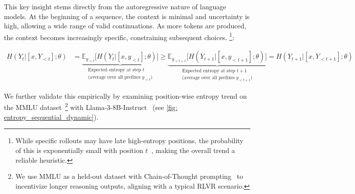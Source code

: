 % 
This key insight stems directly from the autoregressive nature of language models.
%
At the beginning of a sequence, the context is minimal and uncertainty is high, allowing a wide range of valid continuations. 
%
As more tokens are produced, the context becomes increasingly specific, constraining subsequent choices.
%
%
\footnote{While specific rollouts may have late high-entropy positions, the probability of this is exponentially small with position $t$~\citep{yang2025alignment}, making the overall trend a reliable heuristic.}:
%
\begin{small}
\begin{align}
\label{eq:entropy_decay}
H(Y_t | [x, Y_{<t}]; \theta) &= \underbrace{\mathbb{E}_{y_{<t}}\big[ H(Y_t | [x, y_{<t}]; \theta) \big]}_{\substack{\text{Expected entropy at step } t \\ \text{(average over all prefixes } y_{<t}\text{)}}} 
\geq 
\underbrace{\mathbb{E}_{y_{<t+1}}\big[ H(Y_{t+1} | [x, y_{<t+1}]; \theta) \big]}_{\substack{\text{Expected entropy at step } t+1 \\ \text{(average over all prefixes } y_{<t+1}\text{)}}} = H(Y_{t+1} | [x, Y_{<t+1}]; \theta)\nonumber
\end{align}
\end{small}We further validate this empirically by examining position-wise entropy trend on the MMLU dataset~\citep{hendrycks2021measuring}\footnote{We use MMLU as a held-out dataset with Chain-of-Thought prompting~\citep{wei2022chain} to incentivize longer reasoning outputs, aligning with a typical RLVR scenario.} with Llama-3-8B-Instruct~\citep{grattafiori2024llama} (see \cref{fig: entropy_sequential_dynamic}).
